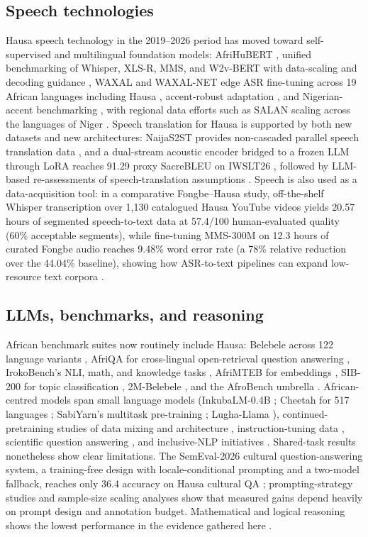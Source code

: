 \documentclass[sn-basic,pdflatex]{sn-jnl}
\begin{document}
\subsection{Speech technologies}
Hausa speech technology in the 2019--2026 period has moved toward self-supervised and multilingual foundation models: AfriHuBERT \citep{p125}, unified benchmarking of Whisper, XLS-R, MMS, and W2v-BERT with data-scaling and decoding guidance \citep{p044}, WAXAL and WAXAL-NET edge ASR fine-tuning across 19 African languages including Hausa \citep{p046,p128}, accent-robust adaptation \citep{p131}, and Nigerian-accent benchmarking \citep{p129}, with regional data efforts such as SALAN scaling across the languages of Niger \citep{p124}. Speech translation for Hausa is supported by both new datasets and new architectures: NaijaS2ST provides non-cascaded parallel speech translation data \citep{p047}, and a dual-stream acoustic encoder bridged to a frozen LLM through LoRA reaches 91.29 proxy SacreBLEU on IWSLT26 \citep{p048}, followed by LLM-based re-assessments of speech-translation assumptions \citep{p130}. Speech is also used as a data-acquisition tool: in a comparative Fongbe--Hausa study, off-the-shelf Whisper transcription over 1{,}130 catalogued Hausa YouTube videos yields 20.57 hours of segmented speech-to-text data at 57.4/100 human-evaluated quality (60\% acceptable segments), while fine-tuning MMS-300M on 12.3 hours of curated Fongbe audio reaches 9.48\% word error rate (a 78\% relative reduction over the 44.04\% baseline), showing how ASR-to-text pipelines can expand low-resource text corpora \citep{p001}.

\subsection{LLMs, benchmarks, and reasoning}
African benchmark suites now routinely include Hausa: Belebele across 122 language variants \citep{p012}, AfriQA for cross-lingual open-retrieval question answering \citep{p113}, IrokoBench's NLI, math, and knowledge tasks \citep{p013}, AfriMTEB for embeddings \citep{p016}, SIB-200 for topic classification \citep{p108}, 2M-Belebele \citep{p114}, and the AfroBench umbrella \citep{p099}. African-centred models span small language models (InkubaLM-0.4B \citep{p100}; Cheetah for 517 languages \citep{p101}; SabiYarn's multitask pre-training \citep{p102}; Lugha-Llama \citep{p014}), continued-pretraining studies of data mixing and architecture \citep{p103}, instruction-tuning data \citep{p104}, scientific question answering \citep{p105}, and inclusive-NLP initiatives \citep{p106}. Shared-task results nonetheless show clear limitations. The SemEval-2026 cultural question-answering system, a training-free design with locale-conditional prompting and a two-model fallback, reaches only 36.4 accuracy on Hausa cultural QA \citep{p020}; prompting-strategy studies \citep{p017} and sample-size scaling analyses \citep{p018} show that measured gains depend heavily on prompt design and annotation budget. Mathematical and logical reasoning shows the lowest performance in the evidence gathered here \citep{p015,p107}.
\end{document}
